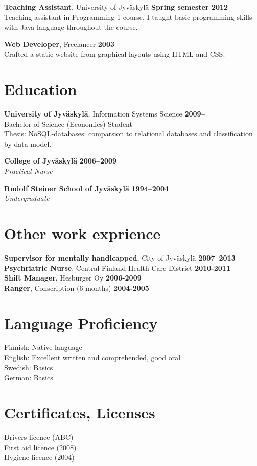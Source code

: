 \documentclass[margin,line]{resume}
\begin{document}
\begin{resume}
\textbf{Teaching Assistant}, University of Jyväskylä  
\hfill\textbf{Spring semester 2012}\\
Teaching assistant in Programming 1 course. I taught basic programming skills with Java language throughout the course.

\textbf{Web Developer}, Freelancer
\hfill\textbf{2003}\\
Crafted a static website from graphical layouts using HTML and CSS.

\section{\mysidestyle Education}

\textbf{University of Jyväskylä}, Information Systems Science \hfill \textbf{2009--} \\
Bachelor of Science (Economics) Student \\
Thesis: NoSQL-databases: comparsion to relational databases and classification by data model.

\textbf{College of Jyväskylä} \hfill \textbf{ 2006--2009}\\
\textsl{Practical Nurse} 

\textbf{Rudolf Steiner School of Jyväskylä} \hfill \textbf{1994--2004}\\
\textsl{Undergraduate} 

\section{\mysidestyle Other work exprience}
\textbf{Supervisor for mentally handicapped}, City of Jyväskylä \hfill\textbf{2007--2013}\\
\textbf{Psychriatric Nurse}, Central Finland Health Care District
\hfill\textbf{2010-2011}\\
\textbf{Shift Manager}, Hesburger Oy \hfill\textbf{2006-2009}\\
\textbf{Ranger}, Conscription (6 months) \hfill\textbf{2004-2005} 
\pagebreak 
  
\section{\mysidestyle Language Proficiency}
Finnish: Native language \\ 
English: Excellent written and comprehended, good oral \\ 
Swedish: Basics \\ 
German: Basics 

\section{\mysidestyle Certificates, Licenses} 
Drivers licence (ABC) \\
First aid licence (2008) \\
Hygiene licence (2004) \\

\end{resume}
\end{document}
